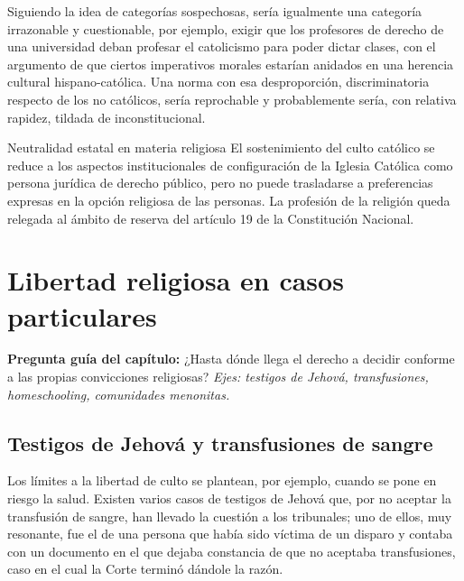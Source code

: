 \documentclass[12pt,oneside]{book}
\begin{document}
Siguiendo la idea de categorías sospechosas, sería igualmente una categoría irrazonable y cuestionable, por ejemplo, exigir que los profesores de derecho de una universidad deban profesar el catolicismo para poder dictar clases, con el argumento de que ciertos imperativos morales estarían anidados en una herencia cultural hispano-católica. Una norma con esa desproporción, discriminatoria respecto de los no católicos, sería reprochable y probablemente sería, con relativa rapidez, tildada de inconstitucional.

\begin{definition}{Neutralidad estatal en materia religiosa}
El sostenimiento del culto católico se reduce a los aspectos institucionales de configuración de la Iglesia Católica como persona jurídica de derecho público, pero no puede trasladarse a preferencias expresas en la opción religiosa de las personas. La profesión de la religión queda relegada al ámbito de reserva del artículo 19 de la Constitución Nacional.
\end{definition}

\chapter{Libertad religiosa en casos particulares}

\begin{note}
\textbf{Pregunta guía del capítulo:} ¿Hasta dónde llega el derecho a decidir conforme a las propias convicciones religiosas? \textit{Ejes: testigos de Jehová, transfusiones, homeschooling, comunidades menonitas.}
\end{note}

\section{Testigos de Jehová y transfusiones de sangre}

Los límites a la libertad de culto se plantean, por ejemplo, cuando se pone en riesgo la salud. Existen varios casos de testigos de Jehová que, por no aceptar la transfusión de sangre, han llevado la cuestión a los tribunales; uno de ellos, muy resonante, fue el de una persona que había sido víctima de un disparo y contaba con un documento en el que dejaba constancia de que no aceptaba transfusiones, caso en el cual la Corte terminó dándole la razón.
\end{document}
